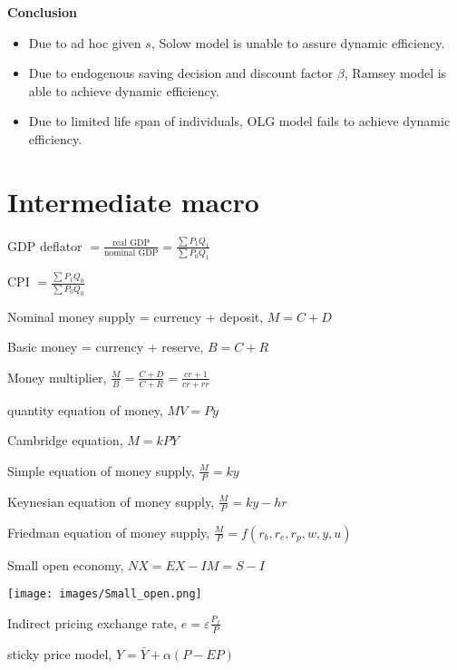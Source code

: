 \documentclass{article}
\providecommand{\tightlist}{
  \setlength{\itemsep}{0pt}
  \setlength{\parskip}{0pt}}
\begin{document}
\textbf{Conclusion}
\begin{itemize}
\tightlist
  \item Due to ad hoc given $s$, Solow model is unable to assure dynamic efficiency.
  \item Due to endogenous saving decision and discount factor $\beta$, Ramsey model is able to achieve dynamic efficiency.
  \item Due to limited life span of individuals, OLG model fails to achieve dynamic efficiency.
\end{itemize}


\newpage
\section{Intermediate macro}

GDP deflator $=\frac{\text{real GDP}}{\text{nominal GDP}}=\frac{\sum P_1 Q_1}{\sum P_0 Q_1}$

CPI $=\frac{\sum P_1 Q_0}{\sum P_0 Q_0}$

Nominal money supply = currency + deposit, $M=C+D$

Basic money = currency + reserve, $B=C+R$

Money multiplier, $\frac{M}{B}=\frac{C+D}{C+R}=\frac{cr+1}{cr+rr}$

quantity equation of money, 
$MV=Py$

Cambridge equation, 
$M=kPY$

Simple equation of money supply, 
$\frac{M}{P}=ky$

Keynesian equation of money supply, 
$\frac{M}{P}=ky-hr$

Friedman equation of money supply, 
$\frac{M}{P}=f(r_b,r_e,r_p,w,y,u)$

Small open economy, 
$NX=EX-IM=S-I$

\texttt{[image: images/Small\_open.png]}

Indirect pricing exchange rate, $e=\varepsilon \frac{P_f}{P}$

sticky price model, $Y=\bar Y +\alpha (P-EP)$
\end{document}
